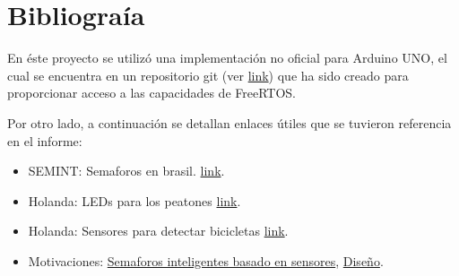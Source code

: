 \section{Bibliograía}\label{sec:bib}

En éste proyecto se utilizó una implementación no oficial para Arduino UNO, el cual se encuentra en un repositorio git (ver \href{https://github.com/feilipu/Arduino\_FreeRTOS\_Library}{link}) que ha sido creado para proporcionar acceso a las capacidades de FreeRTOS.

Por otro lado, a continuación se detallan enlaces útiles que se tuvieron referencia en el informe:
\begin{itemize}
    \item SEMINT: Semaforos en brasil. \href{https://www.youtube.com/channel/UCLH5rWVe1ScpCVoa1rcqT7A}{link}.
    \item Holanda: LEDs para los peatones \href{http://www.t13.cl/noticia/tendencias/ciudad-holandesa-instala-semaforos-suelo-peatones-van-distraidos-sus-celulares}{link}.
    \item Holanda: Sensores para detectar bicicletas \href{https://bicycledutch.wordpress.com/2015/06/09/bicycle-parking-guidance-system-in-utrecht/}{link}.
    \item Motivaciones: \href{http://iiste.org/Journals/index.php/CEIS/article/view/37759}{Semaforos inteligentes basado en sensores},
    \href{http://hyclassproject.com/design-and-construction-of-an-intelligent-traffic-light-control-system.html}{Diseño}.
\end{itemize}